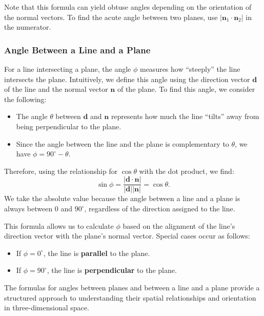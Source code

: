 \noindent Note that this formula can yield obtuse angles depending on the orientation of the normal vectors. To find the acute angle between two planes, use \( |\mathbf{n}_1 \cdot \mathbf{n}_2| \) in the numerator.

\subsubsection*{Angle Between a Line and a Plane}

\noindent For a line intersecting a plane, the angle \( \phi \) measures how “steeply” the line intersects the plane. Intuitively, we define this angle using the direction vector \( \mathbf{d} \) of the line and the normal vector \( \mathbf{n} \) of the plane. To find this angle, we consider the following:
\begin{itemize}
    \item The angle \( \theta \) between \( \mathbf{d} \) and \( \mathbf{n} \) represents how much the line “tilts” away from being perpendicular to the plane.
    \item Since the angle between the line and the plane is complementary to \( \theta \), we have \( \phi = 90^\circ - \theta \).
\end{itemize}

\noindent Therefore, using the relationship for \( \cos \theta \) with the dot product, we find:
\[
\sin \phi = \frac{|\mathbf{d} \cdot \mathbf{n}|}{|\mathbf{d}| |\mathbf{n}|} =  \cos \theta.
\]
We take the absolute value because the angle between a line and a plane is always between \( 0 \) and \( 90^\circ \), regardless of the direction assigned to the line.

\noindent This formula allows us to calculate \( \phi \) based on the alignment of the line’s direction vector with the plane’s normal vector. Special cases occur as follows:
\begin{itemize}
    \item If \( \phi = 0^\circ \), the line is \textbf{parallel} to the plane.
    \item If \( \phi = 90^\circ \), the line is \textbf{perpendicular} to the plane.
\end{itemize}

\noindent The formulas for angles between planes and between a line and a plane provide a structured approach to understanding their spatial relationships and orientation in three-dimensional space.




